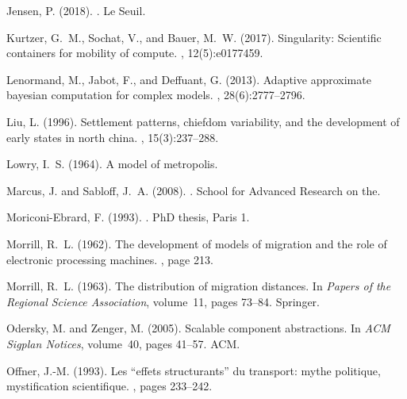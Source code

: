 \documentclass[10pt]{article}
\begin{document}
\begin{thebibliography}{}
Jensen, P. (2018).
.
\newblock Le Seuil.

Kurtzer, G.~M., Sochat, V., and Bauer, M.~W. (2017).
\newblock Singularity: Scientific containers for mobility of compute.
, 12(5):e0177459.

Lenormand, M., Jabot, F., and Deffuant, G. (2013).
\newblock Adaptive approximate bayesian computation for complex models.
, 28(6):2777--2796.

Liu, L. (1996).
\newblock Settlement patterns, chiefdom variability, and the development of
  early states in north china.
, 15(3):237--288.

Lowry, I.~S. (1964).
\newblock A model of metropolis.

Marcus, J. and Sabloff, J.~A. (2008).
.
\newblock School for Advanced Research on the.

Moriconi-Ebrard, F. (1993).
.
\newblock PhD thesis, Paris 1.

Morrill, R.~L. (1962).
\newblock The development of models of migration and the role of electronic
  processing machines.
, page 213.

Morrill, R.~L. (1963).
\newblock The distribution of migration distances.
\newblock In {\em Papers of the Regional Science Association}, volume~11, pages
  73--84. Springer.

Odersky, M. and Zenger, M. (2005).
\newblock Scalable component abstractions.
\newblock In {\em ACM Sigplan Notices}, volume~40, pages 41--57. ACM.

Offner, J.-M. (1993).
\newblock Les ``effets structurants'' du transport: mythe politique,
  mystification scientifique.
, pages 233--242.


\end{thebibliography}
\end{document}
